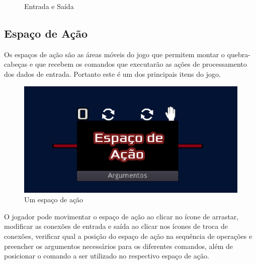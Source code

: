 \begin{figure}[H]
\begin{minipage}{.4\textwidth}
    \end{minipage}
    \caption{Entrada e Saída}
\end{figure}

\subsection{Espaço de Ação}

Os espaços de ação são as áreas móveis do jogo que permitem montar o 
quebra-cabeças e que recebem os comandos que executarão as ações de 
processamento dos dados de entrada. Portanto este é um dos principais itens do 
jogo.

\begin{figure}[H]
    \includegraphics[width=\textwidth]{../figuras/espaco_acao.png}
    \caption{Um espaço de ação}
\end{figure}

O jogador pode movimentar o espaço de ação ao clicar no ícone de arrastar, 
modificar as conexões de entrada e saída ao clicar nos ícones de troca de 
conexões, verificar qual a posição do espaço de ação na sequência de 
operações e preencher os argumentos necessários para os diferentes comandos,
além de posicionar o comando a ser utilizado no respectivo espaço de ação.

